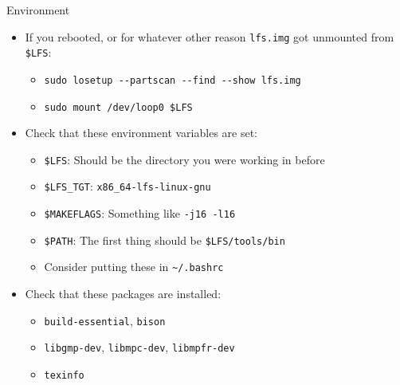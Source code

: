 \documentclass[aspectratio=169]{beamer}
\begin{document}
\begin{frame}{Environment}
	\begin{itemize}
		\item If you rebooted, or for whatever other reason \texttt{lfs.img} got unmounted from \texttt{\$LFS}:
		      \begin{itemize}
			      \item \texttt{sudo losetup -{}-partscan -{}-find -{}-show lfs.img}
			      \item \texttt{sudo mount /dev/loop0 \$LFS}
		      \end{itemize}
		      \vspace{0.5em}
		\item Check that these environment variables are set:
		      \begin{itemize}
			      \item \texttt{\$LFS}: Should be the directory you were working in before
			      \item \texttt{\$LFS\_TGT}: \texttt{x86\_64-lfs-linux-gnu}
			      \item \texttt{\$MAKEFLAGS}: Something like \texttt{-j16 -l16}
			      \item \texttt{\$PATH}: The first thing should be \texttt{\$LFS/tools/bin}
			      \item Consider putting these in \texttt{\textasciitilde/.bashrc}
		      \end{itemize}
		      \vspace{0.5em}
		\item Check that these packages are installed:
		      \begin{itemize}
			      \item \texttt{build-essential}, \texttt{bison}
			      \item \texttt{libgmp-dev}, \texttt{libmpc-dev}, \texttt{libmpfr-dev}
			      \item \texttt{texinfo}
		      \end{itemize}
	\end{itemize}
\end{frame}
\end{document}
